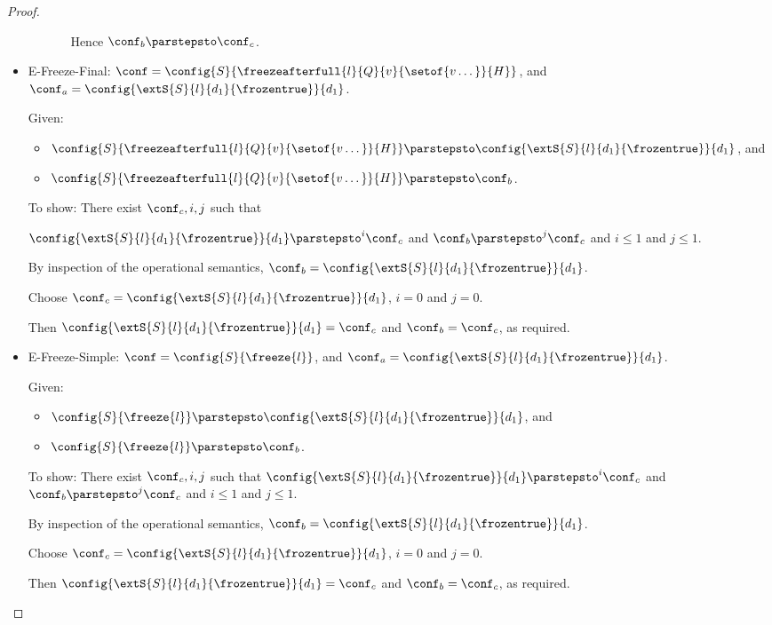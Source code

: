 \begin{proof}
\begin{itemize}
\begin{itemize}
\begin{enumerate}
          Hence $\conf_b \parstepsto \conf_c$.
        \end{enumerate}

      \end{itemize}

    \item {\sc E-Freeze-Final}: $\conf =
      \config{S}{\freezeafterfull{l}{Q}{v}{\setof{v\dots}}{H}}$, and
      $\conf_a = \config{\extS{S}{l}{d_1}{\frozentrue}}{d_1}$.

      Given:
      \begin{itemize}
      \item $\config{S}{\freezeafterfull{l}{Q}{v}{\setof{v\dots}}{H}}
        \parstepsto \config{\extS{S}{l}{d_1}{\frozentrue}}{d_1}$, and
      \item $\config{S}{\freezeafterfull{l}{Q}{v}{\setof{v\dots}}{H}} \parstepsto \conf_b$.
      \end{itemize}

      To show: There exist $\conf_c, i, j$ such that

      $\config{\extS{S}{l}{d_1}{\frozentrue}}{d_1} \parstepsto^i
      \conf_c$ and $\conf_b \parstepsto^j \conf_c$ and $i \leq 1$ and
      $j \leq 1$.

      By inspection of the operational semantics, $\conf_b =
      \config{\extS{S}{l}{d_1}{\frozentrue}}{d_1}$.

      Choose $\conf_c = \config{\extS{S}{l}{d_1}{\frozentrue}}{d_1}$,
      $i = 0$ and $j = 0$.

      Then $\config{\extS{S}{l}{d_1}{\frozentrue}}{d_1} = \conf_c$ and
      $\conf_b = \conf_c$, as required.

    \item {\sc E-Freeze-Simple}: $\conf =
      \config{S}{\freeze{l}}$, and $\conf_a =
      \config{\extS{S}{l}{d_1}{\frozentrue}}{d_1}$.

      Given:
      \begin{itemize}
      \item $\config{S}{\freeze{l}} \parstepsto \config{\extS{S}{l}{d_1}{\frozentrue}}{d_1}$, and
      \item $\config{S}{\freeze{l}} \parstepsto \conf_b$.
      \end{itemize}

      To show: There exist $\conf_c, i, j$ such that
      $\config{\extS{S}{l}{d_1}{\frozentrue}}{d_1} \parstepsto^i
      \conf_c$ and $\conf_b \parstepsto^j \conf_c$ and $i \leq 1$ and
      $j \leq 1$.

      By inspection of the operational semantics, $\conf_b =
      \config{\extS{S}{l}{d_1}{\frozentrue}}{d_1}$.

      Choose $\conf_c = \config{\extS{S}{l}{d_1}{\frozentrue}}{d_1}$,
      $i = 0$ and $j = 0$.

      Then $\config{\extS{S}{l}{d_1}{\frozentrue}}{d_1} = \conf_c$ and
      $\conf_b = \conf_c$, as required.
  \end{itemize}
\end{proof}
